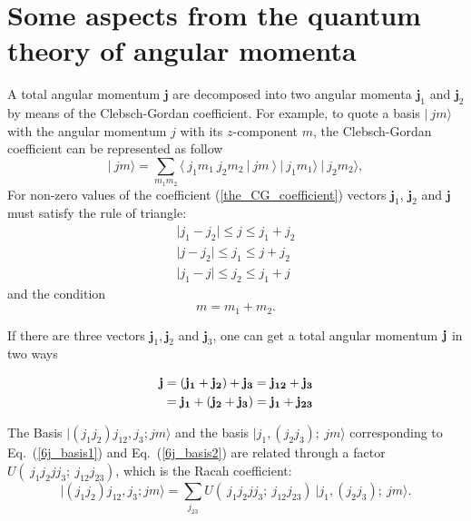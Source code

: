 
\chapter{Some aspects from the quantum theory of angular momenta} %

\label{AppendixA} %
A total angular momentum $\mathbf{j}$ are decomposed into two angular momenta $\mathbf{j}_1$ and $\mathbf{j}_2$ by means of the Clebsch-Gordan coefficient. For example, to quote a basis $\vert ~ jm \rangle $ with the angular momentum $ j$ with its $z$-component $m$, the Clebsch-Gordan coefficient can be represented as follow
\begin{equation}
\label{the_CG_coefficient}
\vert ~ jm \rangle =\sum_{m_1 m_2} \langle ~ j_1 m_1~j_2 m_2~ \vert ~j m~  \rangle ~ \vert ~j_1 m_1 \rangle~ \vert ~j_2 m_2 \rangle,
\end{equation}
For non-zero values of the coefficient (\ref{the_CG_coefficient}) vectors $\mathbf{j}_1$, $\mathbf{j}_2$ and $\mathbf{j}$ must satisfy the rule of triangle:
\begin{align*}
\vert j_1 - j_2 \vert \leq j \leq j_1 + j_2 \\
\vert j - j_2 \vert \leq j_1 \leq j + j_2 \\ 
\vert j_1 - j \vert \leq j_2 \leq j_1 + j 
\end{align*}
and the condition
\begin{equation*}
m=m_1+m_2.
\end{equation*}


If there are three vectors $\mathbf{j}_1, \mathbf{j}_2$ and $\mathbf{j}_3$, one can get a total angular momentum $\bf j$ in two ways

\begin{align}
\label{6j_basis1}
\bf j & =\bf \left( j_1 + j_2 \right) + j_3 = j_{12} + j_3 \\
\label{6j_basis2}		
& = \bf j_1 + \left( j_2  + j_3 \right) = j_1 +j_{23}
\end{align}

The Basis $ \vert (j_1 j_2)j_{12},j_3; jm \rangle$ and the basis $\vert j_1,(j_2 j_3); ~jm \rangle$ corresponding to Eq.~(\ref{6j_basis1}) and Eq.~(\ref{6j_basis2}) are related through a factor $U(~j_1 j_2 j j_3;~ j_{12} j_{23})$, which is the Racah coefficient:
\begin{equation}
\vert (j_1 j_2)j_{12},j_3; jm \rangle = \sum_{j_{23}} U(~j_1 j_2 j j_3;~ j_{12} j_{23}) ~ \vert j_1,(j_2 j_3); ~jm \rangle.
\label{racah_U}
\end{equation}

